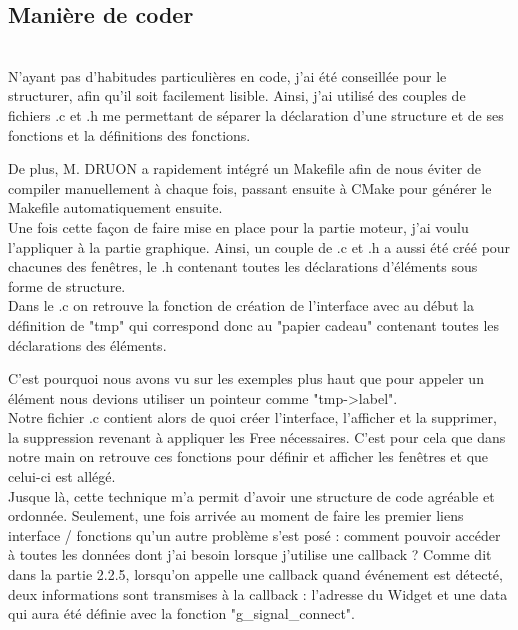 \documentclass[11pt,french,a4paper]{report}
\begin{document}
        \subsection{Manière de coder}\\
N'ayant pas d'habitudes particulières en code, j'ai été conseillée pour le structurer, afin qu'il 
soit facilement lisible. Ainsi, j'ai utilisé des couples de fichiers .c et .h me permettant de séparer 
la déclaration d'une structure et de ses fonctions et la définitions des fonctions.

De plus, M. DRUON a rapidement intégré un Makefile afin de nous éviter de compiler manuellement à chaque fois, passant 
ensuite à CMake pour générer le Makefile automatiquement ensuite. \\
Une fois cette façon de faire mise en place pour la partie moteur, j'ai voulu l'appliquer à la partie
graphique. Ainsi, un couple de .c et .h a aussi été créé pour chacunes des fenêtres, le .h contenant 
toutes les déclarations d'éléments sous forme de structure. \\

Dans le .c on retrouve la fonction de création de l'interface avec au début la définition de "tmp" qui correspond donc 
au "papier cadeau" contenant toutes les déclarations des éléments. 

C'est pourquoi nous avons vu sur les exemples plus haut 
que pour appeler un élément nous devions utiliser un pointeur comme "tmp->label". \\

Notre fichier .c contient alors de quoi créer l'interface, l'afficher et la supprimer, la suppression revenant à appliquer les 
Free  nécessaires. C'est pour cela que dans notre main on retrouve ces fonctions pour définir et afficher les fenêtres 
et que celui-ci est allégé. \\

Jusque là, cette technique m'a permit d'avoir une structure de code agréable et ordonnée. Seulement, une fois arrivée au moment de 
faire les premier liens interface / fonctions qu'un autre problème s'est posé : comment pouvoir accéder à toutes les données
dont j'ai besoin lorsque j'utilise une callback ? 
Comme dit dans la partie 2.2.5, lorsqu'on appelle une callback quand événement est détecté, deux informations sont 
transmises à la callback : l'adresse du Widget et une data qui aura été définie avec la fonction "g\_signal\_connect". \\
\end{document}
